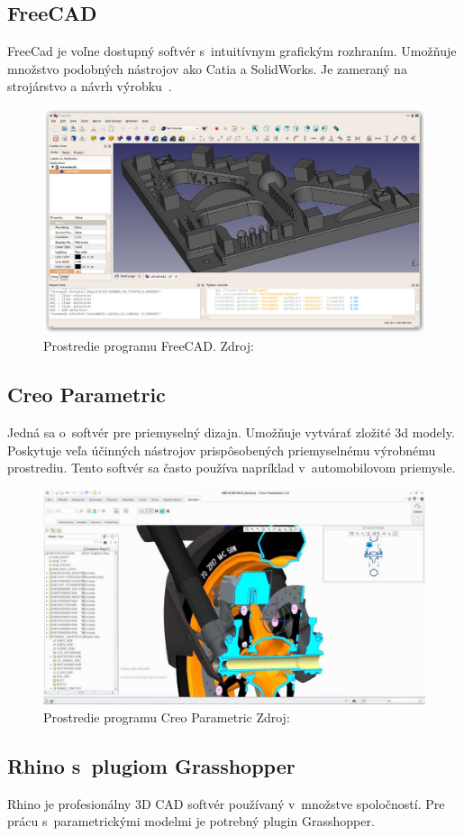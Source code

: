 \subsection*{FreeCAD}
FreeCad je voľne dostupný softvér s~intuitívnym grafickým rozhraním. Umožňuje množstvo podobných nástrojov ako Catia a SolidWorks. Je zameraný na strojárstvo a návrh výrobku~\cite{freecad_2018}.

\begin{figure}[H]
    \centering
    \includegraphics[width = 0.5\linewidth]{obrazky-figures/programs/Freecad_default.jpg}
    \caption{Prostredie programu FreeCAD. Zdroj: \cite{freecad_2018}}
    \label{fig:FreeCAD}
\end{figure}


\subsection*{Creo Parametric}
Jedná sa o~softvér pre priemyselný dizajn. Umožňuje vytvárať zložité 3d modely. Poskytuje veľa účinných nástrojov prispôsobených priemyselnému výrobnému prostrediu. Tento softvér sa často používa napríklad v~automobilovom priemysle.

\begin{figure}[H]
    \centering
    \includegraphics[width = 0.5\linewidth]{obrazky-figures/programs/Creo_Parametric.jpg}
    \caption{Prostredie programu Creo Parametric Zdroj: \cite{ptc_2013} }
    \label{fig:Creo}
\end{figure}


\subsection*{Rhino s~plugiom Grasshopper}
Rhino je profesionálny 3D CAD softvér používaný v~množstve spoločností. Pre prácu s~parametrickými modelmi je potrebný plugin Grasshopper. 

